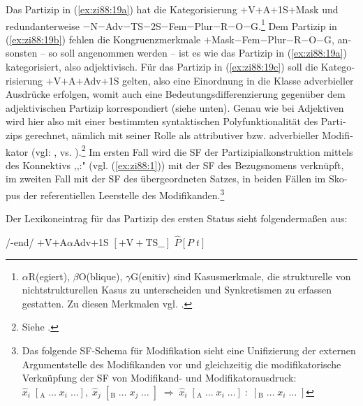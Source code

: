 \documentclass[output=paper,colorlinks,citecolor=brown, booklanguage=german]{langscibook}
\begin{document}
\begin{otherlanguage}{german}
\noindent Das Partizip in (\ref{ex:zi88:19a}) hat die Kategorisierung $+$V$+$A$+$1S$+$Mask und redundanterweise $-$N$-$Adv$-$TS$-$2S$-$Fem$-$Plur$-$R$-$O$-$G.\footnote{$\alpha$R(egiert), $\beta$O(blique), $\gamma$G(enitiv) sind Kasusmerkmale, die strukturelle von nichtstrukturellen Kasus zu unterscheiden und Synkretismen zu erfassen gestatten. Zu diesen Merkmalen vgl. \citet{Bierwisch1967}.} Dem Partizip in (\ref{ex:zi88:19b}) fehlen die Kongruenzmerkmale $+$Mask$-$Fem$-$Plur$-$R$-$O$-$G, ansonsten -- so soll angenommen werden -- ist es wie das Partizip in (\ref{ex:zi88:19a}) kategorisiert, also adjektivisch. Für das Partizip in (\ref{ex:zi88:19c}) soll die Kategorisierung $+$V$+$A$+$Adv$+$1S gelten, also eine Einordnung in die Klasse adverbieller Ausdrücke erfolgen, womit auch eine Bedeutungsdifferenzierung gegenüber dem adjektivischen Partizip korrespondiert (siehe unten). Genau wie bei Adjektiven wird hier also mit einer bestimmten syntaktischen Polyfunktionalität des Partizips gerechnet, nämlich mit seiner Rolle als attributiver bzw. adverbieller Modifikator (vgl: ,  vs. ).\footnote{Siehe \citet{Zimmermann1985,Zimmermann1987c,Zimmermann1987a,Zimmermann1988-druck}.} Im ersten Fall wird die SF der Partizipialkonstruktion mittels des Konnektivs ,,:" (vgl. (\ref{ex:zi88:1})) mit der SF des Bezugsnomens verknüpft, im zweiten Fall mit der SF des übergeordneten Satzes, in beiden Fällen im Skopus der referentiellen Leerstelle des Modifikanden.\footnote{\label{fn:zi88:28} Das folgende SF-Schema für Modifikation sieht eine Unifizierung der externen Argumentstelle des Modifikanden vor und gleichzeitig die modifikatorische Verknüpfung der SF von Modifikand- und Modifikatorausdruck:
    \ea $\hat{x}_i \; [_{\textrm{A}} \; \dots \; x_i \; \dots], \; \hat{x}_j \; [_{\textrm{B}} \; \dots \; x_j \; \dots \; ] \; \Rightarrow \; \hat{x}_i \; [_{\textrm{A}} \; \dots \; x_i \; \dots] \; : \; [_{\textrm{B}} \; \dots \; x_i \; \dots \; ]$\z}

Der Lexikoneintrag für das Partizip des ersten Status sieht folgendermaßen aus:

\ea\label{ex:zi88:20}
    \ea\label{ex:zi88:20a} /-end/
    \ex\label{ex:zi88:20b} $+$V$+$A$\alpha$Adv$+$1S
    \ex\label{ex:zi88:20c} $[+\textrm{V}+\textrm{TS} \_\_ ]$
    \ex\label{ex:zi88:20d} $\hat{P} [P \; t]$
\z\z 


\end{otherlanguage}
\end{document}
